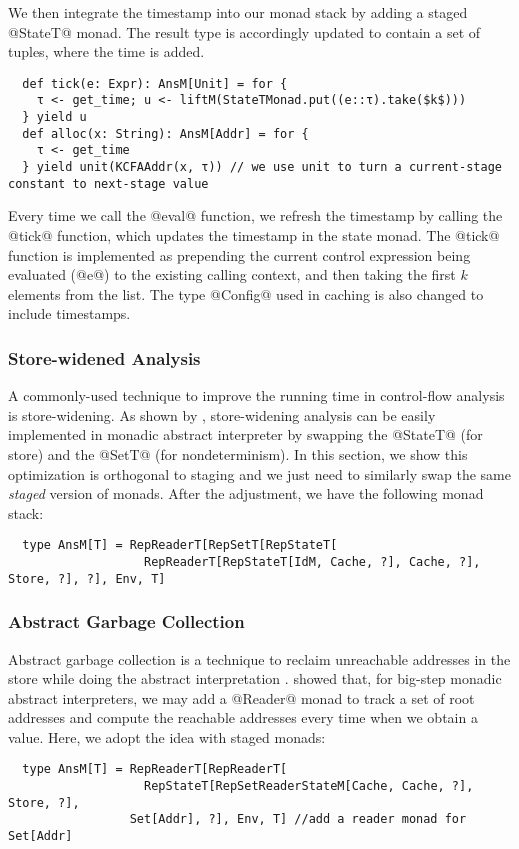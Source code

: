 We then integrate the timestamp into our monad stack by adding a staged
@StateT@ monad. The result type is accordingly updated to contain a set of
tuples, where the time is added.
\begin{lstlisting}
  def tick(e: Expr): AnsM[Unit] = for {
    τ <- get_time; u <- liftM(StateTMonad.put((e::τ).take($k$)))
  } yield u
  def alloc(x: String): AnsM[Addr] = for {
    τ <- get_time
  } yield unit(KCFAAddr(x, τ)) // we use unit to turn a current-stage constant to next-stage value
\end{lstlisting}

Every time we call the @eval@ function, we refresh the timestamp by
calling the @tick@ function, which updates the timestamp in the state monad.
The @tick@ function is implemented as prepending the current control expression
being evaluated (@e@) to the existing calling context, and then taking the
first $k$ elements from the list.  The type @Config@ used in caching is also
changed to include timestamps.

\subsubsection{Store-widened Analysis}

A commonly-used technique to improve the running time in control-flow analysis
is store-widening. As shown by \cite{Darais:2015:GTM:2814270.2814308,
DBLP:journals/pacmpl/DaraisLNH17}, store-widening analysis can be easily
implemented in monadic abstract interpreter by swapping the @StateT@ (for store)
and the @SetT@ (for nondeterminism). In this section, we show this optimization
is orthogonal to staging and we just need to similarly swap the same \textit{staged}
version of monads. After the adjustment, we have the following monad stack:
\begin{lstlisting}
  type AnsM[T] = RepReaderT[RepSetT[RepStateT[
                   RepReaderT[RepStateT[IdM, Cache, ?], Cache, ?], Store, ?], ?], Env, T]
\end{lstlisting}

\subsubsection{Abstract Garbage Collection}

Abstract garbage collection is a technique to reclaim unreachable addresses in
the store while doing the abstract interpretation
\cite{Might:2006:IFA:1159803.1159807}. \citet{DBLP:journals/pacmpl/DaraisLNH17}
showed that, for big-step monadic abstract interpreters, we may add a @Reader@
monad to track a set of root addresses and compute the reachable addresses every
time when we obtain a value. Here, we adopt the idea with staged monads:
\begin{lstlisting}
  type AnsM[T] = RepReaderT[RepReaderT[
                   RepStateT[RepSetReaderStateM[Cache, Cache, ?], Store, ?],
                 Set[Addr], ?], Env, T] //add a reader monad for Set[Addr]
\end{lstlisting}

